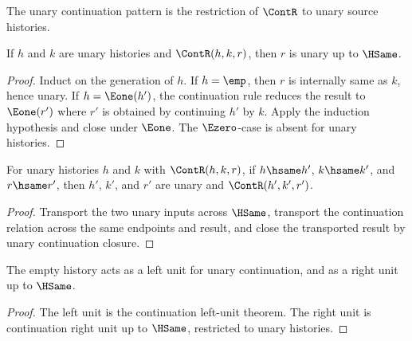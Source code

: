 \begin{definition}
The unary continuation pattern is the restriction of \(\ContR\) to unary source histories.
\end{definition}

\begin{theorem}
\label{thm:unary-continuation-closure-up-to-hsame}
If \(h\) and \(k\) are unary histories and \(\ContR(h,k,r)\), then \(r\) is unary up to \(\HSame\).
\end{theorem}
\begin{proof}
Induct on the generation of \(h\). If \(h=\emp\), then \(r\) is internally same as \(k\), hence unary. If \(h=\Eone(h')\), the continuation rule reduces the result to \(\Eone(r')\) where \(r'\) is obtained by continuing \(h'\) by \(k\). Apply the induction hypothesis and close under \(\Eone\). The \(\Ezero\)-case is absent for unary histories.
\end{proof}

\begin{theorem}
\label{thm:add-unary-continuation-hsame-transport}
For unary histories $h$ and $k$ with $\ContR(h,k,r)$, if $h\hsame h'$,
$k\hsame k'$, and $r\hsame r'$, then $h'$, $k'$, and $r'$ are unary and
$\ContR(h',k',r')$.
\end{theorem}
\begin{proof}
Transport the two unary inputs across $\HSame$, transport the continuation
relation across the same endpoints and result, and close the transported result
by unary continuation closure.
\end{proof}

\begin{theorem}
\label{thm:unary-addition-like-unit-spine}
\label{thm:addition-like-unit}
The empty history acts as a left unit for unary continuation, and as a right unit up to \(\HSame\).
\end{theorem}
\begin{proof}
The left unit is the continuation left-unit theorem. The right unit is continuation right unit up to \(\HSame\), restricted to unary histories.
\end{proof}

